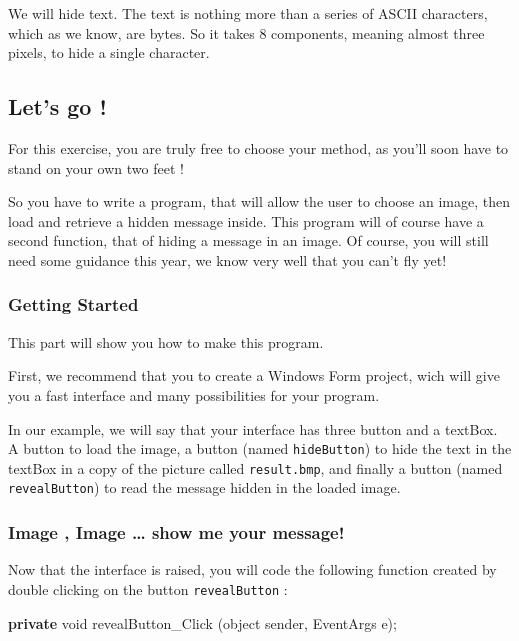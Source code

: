 \documentclass[11pt, a4paper]{article}
\newenvironment{Shaded}{}{}
\newcommand{\KeywordTok}[1]{\textcolor[rgb]{0.00,0.44,0.13}{\textbf{{#1}}}}
\newcommand{\DataTypeTok}[1]{\textcolor[rgb]{0.56,0.13,0.00}{{#1}}}
\newcommand{\FunctionTok}[1]{\textcolor[rgb]{0.02,0.16,0.49}{{#1}}}
\newcommand{\NormalTok}[1]{{#1}}
\begin{document}
We will hide text. The text is nothing more than a series of ASCII
characters, which as we know, are bytes. So it takes 8 components,
meaning almost three pixels, to hide a single character.

\subsection{Let's go !}\label{lets-go}

For this exercise, you are truly free to choose your method, as you'll
soon have to stand on your own two feet !

So you have to write a program, that will allow the user to choose an
image, then load and retrieve a hidden message inside. This program will
of course have a second function, that of hiding a message in an image.
Of course, you will still need some guidance this year, we know very
well that you can't fly yet!

\subsubsection{Getting Started}\label{getting-started}

This part will show you how to make this program.

First, we recommend that you to create a Windows Form project, wich will
give you a fast interface and many possibilities for your program.

In our example, we will say that your interface has three button and a
textBox. A button to load the image, a button (named
\texttt{hideButton}) to hide the text in the textBox in a copy of the
picture called \texttt{result.bmp}, and finally a button (named
\texttt{revealButton}) to read the message hidden in the loaded image.

\subsubsection{Image , Image \ldots{} show me your
message!}\label{image-image-show-me-your-message}

Now that the interface is raised, you will code the following function
created by double clicking on the button \texttt{revealButton} :

\begin{Shaded}
\begin{Highlighting}[]
\KeywordTok{private} \DataTypeTok{void} \FunctionTok{revealButton_Click} \NormalTok{(}\DataTypeTok{object} \NormalTok{sender, EventArgs e);}
\end{Highlighting}
\end{Shaded}
\end{document}
